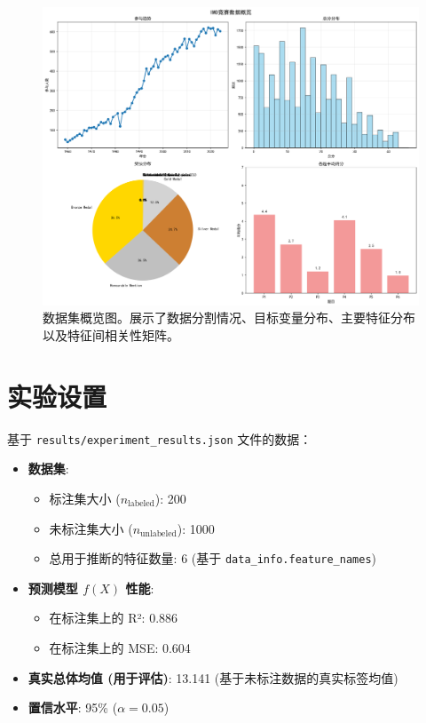 \documentclass[12pt,a4paper]{article}
\begin{document}
\begin{figure}[H]
    \centering
    \includegraphics[width=1.0\textwidth]{data_overview.png}
    \caption{数据集概览图。展示了数据分割情况、目标变量分布、主要特征分布以及特征间相关性矩阵。}
\end{figure}

\section{实验设置}
\indent 基于 \texttt{results/experiment\_results.json} 文件的数据：
\begin{itemize}
    \item \textbf{数据集}:
    \begin{itemize}
        \item 标注集大小 ($n_{\text{labeled}}$): 200
        \item 未标注集大小 ($n_{\text{unlabeled}}$): 1000
        \item 总用于推断的特征数量: 6 (基于 \texttt{data\_info.feature\_names})
    \end{itemize}
    \item \textbf{预测模型 $f(X)$ 性能}:
    \begin{itemize}
        \item 在标注集上的 R²: 0.886
        \item 在标注集上的 MSE: 0.604
    \end{itemize}
    \item \textbf{真实总体均值 (用于评估)}: 13.141 (基于未标注数据的真实标签均值)
    \item \textbf{置信水平}: 95\% ($\alpha = 0.05$)
\end{itemize}
\end{document}
